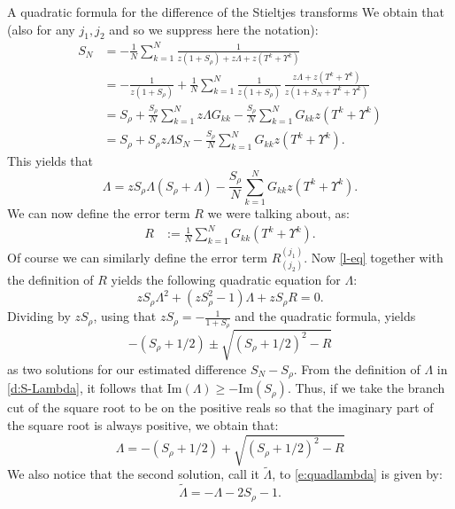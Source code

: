 \documentclass[11pt, a4paper, oneside]{book}
\numberwithin{equation}{chapter}
\newcommand{\beq}{\begin{equation}}
\newcommand{\eeq}{\end{equation}}
\begin{document}
\begin{section}{A quadratic formula for the difference of the Stieltjes transforms}
We obtain that (also for any $j_1, j_2$ and so we suppress here the notation):
%
\begin{equation}
%
\begin{split}
S_N
&
= - \frac{1}{N} \sum_{k=1}^N
\frac{1}{z (1+ S_{\rho}) + z \Lambda  + z (T^k + \Upsilon^{k})
}
\\
&
=-  \frac{1}{z (1+S_{\rho})} + \frac{1}{N} \sum_{k=1}^N
\frac{1}{z (1+S_{\rho})}\,\frac{ z \Lambda  + {z}(T^k + \Upsilon^{k})}{z \left(1+S_N + T^k + \Upsilon^{k} \right)}
\\
&
= S_{\rho} + \frac{S_{\rho}}{N} \sum_{k=1}^N z \Lambda G_{kk}  - \frac{S_{\rho}}{N} \sum_{k=1}^N G_{kk} z (T^k + \Upsilon^{k})
\\
&
= S_{\rho} + S_{\rho} z \Lambda S_N  - \frac{S_{\rho}}{N} \sum_{k=1}^N G_{kk} z (T^k + \Upsilon^{k}) .
\end{split}\end{equation}
%
This yields that
\begin{equation} \label{l-eq}
\Lambda =
 z S_{\rho} \Lambda (S_{\rho} + \Lambda)  -  \frac{S_{\rho}}{N} \sum_{k=1}^N G_{kk} z (T^k + \Upsilon^{k} ) .
\end{equation}
%
We can now define the error term $R$ we were talking about, as:
\begin{align}
R &:= \frac{1}{N} \sum_{k=1}^N G_{kk} (T^k + \Upsilon^{k}).
\end{align}
Of course we can similarly define the error term $R^{(j_1)}_{(j_2)}$.
%
Now \eqref{l-eq} together with the definition of $R$ yields the following quadratic equation for $\Lambda$:
%
\begin{equation} \label{e:quadlambda}
z S_{\rho} \Lambda^2 + (z S_{\rho}^2 - 1)\Lambda + z S_{\rho} R = 0.
\end{equation}
%
Dividing by $z S_{\rho}$, using that $z S_{\rho} = -\frac{1}{1+S_{\rho}}$ and the quadratic formula, yields
%
\begin{equation}
-(S_{\rho} + 1/2) \pm \sqrt{(S_{\rho} + 1/2)^2 - R}
\end{equation}
%
as two solutions for our estimated difference $ S_N - S_{\rho}.$ From the definition of $\Lambda$ in \eqref{d:S-Lambda}, it follows that $\mathrm{Im} ( \Lambda ) \geq -\mathrm{Im}(S_{\rho})$. Thus, if we take the branch cut of the square root to be on the positive reals so that the imaginary part of the square root is always positive, we obtain that:
%
\begin{equation}
\Lambda =  -(S_{\rho} + 1/2) + \sqrt{(S_{\rho} + 1/2)^2 - R}
\end{equation}
%
We also notice that the second solution, call it $\tilde{\Lambda}$, to  \eqref{e:quadlambda} is given by:
\beq\label{d:tildeLambda}
\tilde{\Lambda} = -\Lambda - 2S_{\rho} - 1.
\eeq
%
\end{section}
\end{document}
